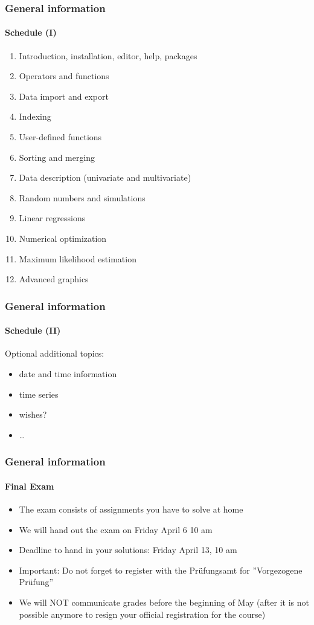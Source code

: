 \documentclass[title={Introduction to R}, author={Mutschler and Zaharieva}, inst={Institute for Econometrics and Empirical Economics}]{beamer}
\begin{document}
\begin{frame}
\frametitle{General information}
\framesubtitle{Schedule (I)}
\begin{enumerate}
\item Introduction, installation, editor, help, packages
\item Operators and functions
\item Data import and export
\item Indexing
\item User-defined functions
\item Sorting and merging
\item Data description (univariate and multivariate)
\item Random numbers and simulations
\item Linear regressions
\item Numerical optimization
\item Maximum likelihood estimation
\item Advanced graphics
\end{enumerate}
\end{frame}


\begin{frame}
\frametitle{General information}
\framesubtitle{Schedule (II)}
Optional additional topics:
\begin{itemize}
\item date and time information
\item time series
\item wishes?
\item \ldots
\end{itemize}
\end{frame}


\begin{frame}
\frametitle{General information}
\framesubtitle{Final Exam}
\begin{itemize}
	\item The exam consists of assignments you have to solve at home
	\item We will hand out the exam on Friday April 6 10 am
	\item Deadline to hand in your solutions: Friday April 13, 10 am
	\item Important: Do not forget to register with the Prüfungsamt for ''Vorgezogene Prüfung''
	\item We will NOT communicate grades before the beginning of May (after it is not possible anymore to resign your official registration for the course)
	
\end{itemize}

\end{frame}
\end{document}
